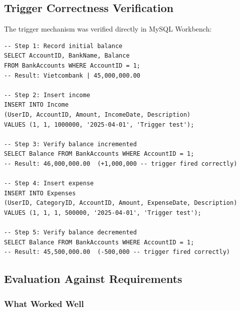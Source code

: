 \documentclass[12pt, a4paper]{article}
\begin{document}
\subsection{Trigger Correctness Verification}

The trigger mechanism was verified directly in MySQL Workbench:

\begin{lstlisting}[style=sqlstyle, caption={Trigger Verification Queries}]
-- Step 1: Record initial balance
SELECT AccountID, BankName, Balance
FROM BankAccounts WHERE AccountID = 1;
-- Result: Vietcombank | 45,000,000.00

-- Step 2: Insert income
INSERT INTO Income 
(UserID, AccountID, Amount, IncomeDate, Description)
VALUES (1, 1, 1000000, '2025-04-01', 'Trigger test');

-- Step 3: Verify balance incremented
SELECT Balance FROM BankAccounts WHERE AccountID = 1;
-- Result: 46,000,000.00  (+1,000,000 -- trigger fired correctly)

-- Step 4: Insert expense
INSERT INTO Expenses
(UserID, CategoryID, AccountID, Amount, ExpenseDate, Description)
VALUES (1, 1, 1, 500000, '2025-04-01', 'Trigger test');

-- Step 5: Verify balance decremented
SELECT Balance FROM BankAccounts WHERE AccountID = 1;
-- Result: 45,500,000.00  (-500,000 -- trigger fired correctly)
\end{lstlisting}

\subsection{Evaluation Against Requirements}

\subsubsection{What Worked Well}
\end{document}
